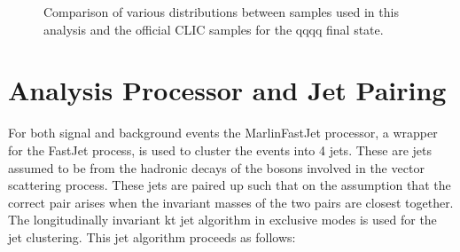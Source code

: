 \begin{figure}
\centering
{}
\caption[Comparison of various distributions between samples used in this analysis and the official CLIC samples for the \nu{\nu}qqqq final state.]{Comparison of various distributions between samples used in this analysis and the official CLIC samples for the \nu{\nu}qqqq final state.}
\label{fig:cliccomp}
\end{figure}

\section{Analysis Processor and Jet Pairing} \label{sec:jetpairing}

For both signal and background events the MarlinFastJet processor, a wrapper for the FastJet \cite{Cacciari:2011ma} process, is used to cluster the events into 4 jets. These are  jets assumed to be from the hadronic decays of the bosons involved in the vector scattering process.  These jets are paired up such that on the assumption that the correct pair arises when the invariant masses of the two pairs are closest together. The longitudinally invariant kt jet algorithm in exclusive modes is used for the jet clustering.
This jet algorithm proceeds as follows:

